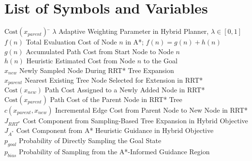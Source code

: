 \documentclass[a4paper,12pt,one side]{report}
\theoremstyle{definition}
\begin{document}
\chapter*{List of Symbols and Variables}
\vspace{1cm}
\begin{tabbing}
$\text{Cost}(x_{parent})$\hspace{0.8cm} \= \kill
$\lambda$                    \> Adaptive Weighting Parameter in Hybrid Planner, $\lambda \in [0,1]$ \\[4pt]


$f(n)$                       \> Total Evaluation Cost of Node $n$ in A*; $f(n) = g(n) + h(n)$ \\[4pt]
$g(n)$                       \> Accumulated Path Cost from Start Node to Node $n$ \\[4pt]
$h(n)$                       \> Heuristic Estimated Cost from Node $n$ to the Goal \\[4pt]
$x_{new}$                    \> Newly Sampled Node During RRT* Tree Expansion \\[4pt]
$x_{parent}$                 \> Nearest Existing Tree Node Selected for Extension in RRT* \\[4pt]
$\text{Cost}(x_{new})$       \> Path Cost Assigned to a Newly Added Node in RRT* \\[4pt]
$\text{Cost}(x_{parent})$    \> Path Cost of the Parent Node in RRT* Tree \\[4pt]
$c(x_{parent}, x_{new})$     \> Incremental Edge Cost from Parent Node to New Node in RRT* \\[4pt]

$J_{RRT^*}$                  \> Cost Component from Sampling-Based Tree Expansion in Hybrid Objective \\[4pt]
$J_{A^*}$                    \> Cost Component from A* Heuristic Guidance in Hybrid Objective \\[4pt]
$p_{goal}$                   \> Probability of Directly Sampling the Goal State \\[4pt]
$p_{bias}$                   \> Probability of Sampling from the A*-Informed Guidance Region \\[4pt]


\end{tabbing}
\end{document}
